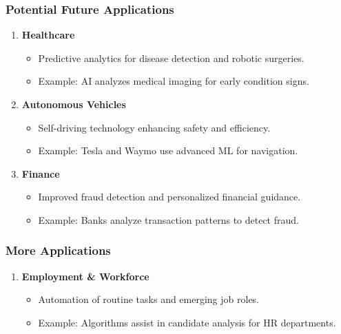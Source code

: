 \documentclass{beamer}
\begin{document}
\begin{frame}[fragile]
    \frametitle{Potential Future Applications}
    \begin{enumerate}
        \item \textbf{Healthcare}
            \begin{itemize}
                \item Predictive analytics for disease detection and robotic surgeries.
                \item Example: AI analyzes medical imaging for early condition signs.
            \end{itemize}

        \item \textbf{Autonomous Vehicles}
            \begin{itemize}
                \item Self-driving technology enhancing safety and efficiency.
                \item Example: Tesla and Waymo use advanced ML for navigation.
            \end{itemize}

        \item \textbf{Finance}
            \begin{itemize}
                \item Improved fraud detection and personalized financial guidance.
                \item Example: Banks analyze transaction patterns to detect fraud.
            \end{itemize}
    \end{enumerate}
\end{frame}

\begin{frame}[fragile]
    \frametitle{More Applications}
    \begin{enumerate}[resume]
        \item \textbf{Employment \& Workforce}
            \begin{itemize}
                \item Automation of routine tasks and emerging job roles.
                \item Example: Algorithms assist in candidate analysis for HR departments.
            \end{itemize}
    \end{enumerate}
\end{frame}
\end{document}
